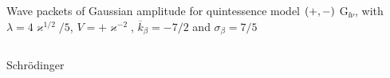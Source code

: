 \documentclass[8pt]{beamer}
\begin{document}
\begin{frame}%
{Wave packets of Gaussian amplitude for quintessence model ${\left(+,-\right)}$}%
{$\mathrm{G}_{\ii\nu}$, with $\lambda = 4\varkappa^{1/2}/5$,
$V = +\varkappa^{-2}$, $\overline{k}_\beta = -7/2$ and $\sigma_\beta = 7/5$}
\begin{columns}
\begin{column}{.49\textwidth}
\begin{block}{Schrödinger}

\end{block}
\end{column}
\end{columns}
\end{frame}
\end{document}
